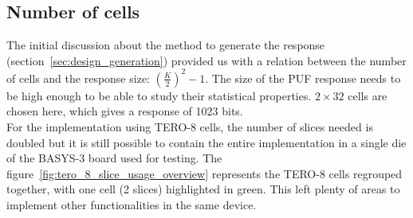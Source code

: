 \subsection{Number of cells}
\label{subsec:impl_number_of_cell}




\begin{minipage}[b]{0.55\linewidth} 
The initial discussion about the method to generate the response (section~\ref{sec:design_generation}) provided us with a relation between the number of cells and the response size:  $\left ( \frac{K}{2}\right )^2 -1$. The size of the PUF response needs to be high enough to be able to study their statistical properties. $2\times32$ cells are chosen here, which gives a response of 1023 bits.\\

For the implementation using TERO-8 cells, the number of slices needed is doubled but it is still possible to contain the entire implementation in a single die of the BASYS-3 board used for testing. The figure~\ref{fig:tero_8_slice_usage_overview} represents the TERO-8 cells regrouped together, with one cell (2 slices) highlighted in green. This left plenty of areas to implement other functionalities in the same device.
\end{minipage}\hfill

